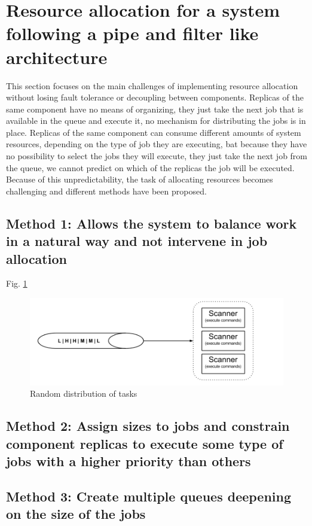 \documentclass[fleqn,10pt]{./class/wlscirep}
\begin{document}
\section{Resource allocation for a system following a pipe and filter like architecture}
This section focuses on the main challenges of implementing resource allocation without losing fault tolerance or decoupling between components. Replicas of the same component have no means of organizing, they just take the next job that is available in the queue and execute it, no mechanism for distributing the jobs is in place. Replicas of the same component can consume different amounts of system resources, depending on the type of job they are executing, bat because they have no possibility to select the jobs they will execute, they just take the next job from the queue, we cannot predict on which of the replicas the job will be executed. Because of this unpredictability, the task of allocating resources becomes challenging and different methods have been proposed.

\subsection{Method 1: Allows the system to balance work in a natural way and not intervene in job allocation}
Fig. \ref{fig:randomDIstributionsOfTasks}

\begin{figure}[ht]
\centering
\includegraphics[width=\linewidth]{./img/1_NaturalLoadBalancing.png}
\caption{Random distribution of tasks}
\label{fig:randomDIstributionsOfTasks}
\end{figure}

\subsection{Method 2: Assign sizes to jobs and constrain component replicas to execute some type of jobs with a higher priority than others}

\subsection{Method 3: Create multiple queues deepening on the size of the jobs}
\end{document}
